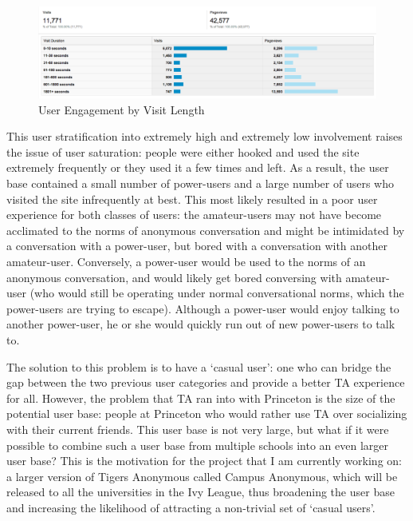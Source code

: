 \begin{figure}[H]
\centering
\includegraphics[trim= 0mm 0mm 0mm 0mm, clip, scale=0.3]{./Figures/UserStratificationVisitLength}
\caption{User Engagement by Visit Length}
\label{fig:UserStratificationVisitLength}
\end{figure}

This user stratification into extremely high and extremely low involvement raises the issue of user saturation: people were either hooked and used the site extremely frequently or they used it a few times and left. As a result, the user base contained a small number of power-users and a large number of users who visited the site infrequently at best. This most likely resulted in a poor user experience for both classes of users: the amateur-users may not have become acclimated to the norms of anonymous conversation and might be intimidated by a conversation with a power-user, but bored with a conversation with another amateur-user. Conversely, a power-user would be used to the norms of an anonymous conversation, and would likely get bored conversing with amateur-user (who would still be operating under normal conversational norms, which the power-users are trying to escape). Although a power-user would enjoy talking to another power-user, he or she would quickly run out of new power-users to talk to.

The solution to this problem is to have a `casual user': one who can bridge the gap between the two previous user categories and provide a better TA experience for all. However, the problem that TA ran into with Princeton is the size of the potential user base: people at Princeton who would rather use TA over socializing with their current friends. This user base is not very large, but what if it were possible to combine such a user base from multiple schools into an even larger user base? This is the motivation for the project that I am currently working on: a larger version of Tigers Anonymous called Campus Anonymous, which will be released to all the universities in the Ivy League, thus broadening the user base and increasing the likelihood of attracting a non-trivial set of `casual users'.
